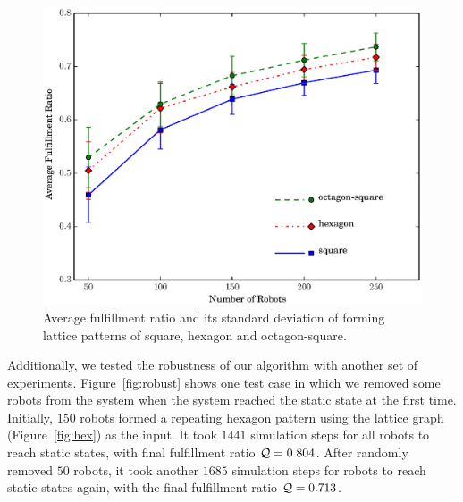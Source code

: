 \begin{figure}
    \centering
   \includegraphics[width=\textwidth]{figs/exp_qual}
    \caption{Average fulfillment ratio and its standard deviation of forming lattice patterns of square, hexagon and octagon-square.} 
    \label{fig:exp-qual}
\end{figure}


Additionally, we tested the robustness of our algorithm with another set of experiments.
%
Figure~\ref{fig:robust} shows one test case in which we removed some robots from the system when the system reached the static state at the first time.
%
Initially, $150$ robots formed a repeating hexagon pattern using the lattice graph (Figure~\ref{fig:hex}) as the input.  
%
It took $1441$ simulation steps for all robots to reach static states, with final fulfillment ratio $\mathcal{Q}=0.804$. 
%
After randomly removed $50$ robots, it took another $1685$ simulation steps for robots to reach static states again, with the final fulfillment ratio $\mathcal{Q}=0.713$. 
%

